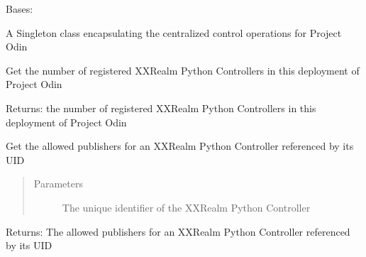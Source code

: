 \documentclass[letterpaper,10pt,english]{sphinxmanual}
\begin{document}
\begin{fulllineitems}
\label{\detokenize{Realms:Realms.Realms}}
\sphinxAtStartPar
Bases: 

\sphinxAtStartPar
A Singleton class encapsulating the centralized control operations for Project Odin

\begin{fulllineitems}
\label{\detokenize{Realms:Realms.Realms.exposed_controllers_count}}
\sphinxAtStartPar
Get the number of registered XXRealm Python Controllers in this deployment of Project Odin

\sphinxAtStartPar
Returns: the number of registered XXRealm Python Controllers in this deployment of Project Odin

\end{fulllineitems}


\begin{fulllineitems}
\label{\detokenize{Realms:Realms.Realms.exposed_get_allowed_publishers}}
\sphinxAtStartPar
Get the allowed publishers for an XXRealm Python Controller referenced by its UID
\begin{quote}\begin{description}
\item[{Parameters}] \leavevmode
\sphinxAtStartPar
{} \textendash{} The unique identifier of the XXRealm Python Controller

\end{description}\end{quote}

\sphinxAtStartPar
Returns: The allowed publishers for an XXRealm Python Controller referenced by its UID


\end{fulllineitems}
\end{fulllineitems}
\end{document}
